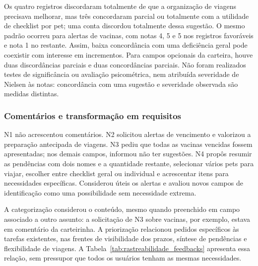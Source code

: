 \documentclass{UNESC}
\begin{document}
Os quatro registros discordaram totalmente de que a organização de viagens precisava melhorar, mas três concordaram parcial ou totalmente com a utilidade de checklist por pet; uma conta discordou totalmente dessa sugestão. O mesmo padrão ocorreu para alertas de vacinas, com notas 4, 5 e 5 nos registros favoráveis e nota 1 no restante. Assim, baixa concordância com uma deficiência geral pode coexistir com interesse em incrementos. Para campos opcionais da carteira, houve duas discordâncias parciais e duas concordâncias parciais. Não foram realizados testes de significância ou avaliação psicométrica, nem atribuída severidade de Nielsen às notas: concordância com uma sugestão e severidade observada são medidas distintas.

\subsubsection{Comentários e transformação em requisitos}

N1 não acrescentou comentários. N2 solicitou alertas de vencimento e valorizou a preparação antecipada de viagens. N3 pediu que todas as vacinas vencidas fossem apresentadas; nos demais campos, informou não ter sugestões. N4 propôs resumir as pendências com dois nomes e a quantidade restante, selecionar vários pets para viajar, escolher entre checklist geral ou individual e acrescentar itens para necessidades específicas. Considerou úteis os alertas e avaliou novos campos de identificação como uma possibilidade sem necessidade extrema.

A categorização considerou o conteúdo, mesmo quando preenchido em campo associado a outro assunto: a solicitação de N3 sobre vacinas, por exemplo, estava em comentário da carteirinha. A priorização relacionou pedidos específicos às tarefas existentes, nas frentes de visibilidade dos prazos, síntese de pendências e flexibilidade de viagens. A Tabela~\ref{tab:rastreabilidade_feedbacks} apresenta essa relação, sem pressupor que todos os usuários tenham as mesmas necessidades.
\end{document}
